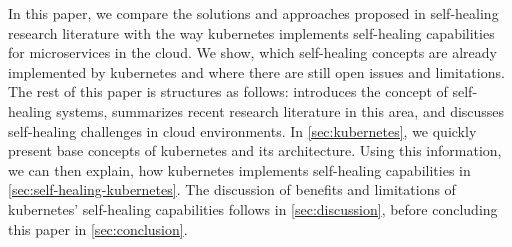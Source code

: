   In this paper, we compare the solutions and approaches proposed in self-healing research literature with the way \gls{kubernetes} implements self-healing capabilities for microservices in the cloud.
  We show, which self-healing concepts are already implemented by \gls{kubernetes} and where there are still open issues and limitations.
  The rest of this paper is structures as follows:
   introduces the concept of self-healing systems, summarizes recent research literature in this area, and discusses self-healing challenges in cloud environments.
  In \cref{sec:kubernetes}, we quickly present base concepts of \gls{kubernetes} and its architecture.
  Using this information, we can then explain, how \gls{kubernetes} implements self-healing capabilities in \cref{sec:self-healing-kubernetes}.
  The discussion of benefits and limitations of \gls{kubernetes}' self-healing capabilities follows in \cref{sec:discussion}, before concluding this paper in \cref{sec:conclusion}.
